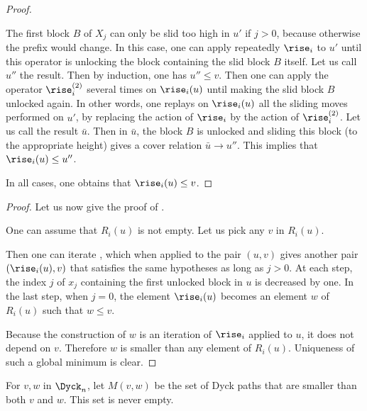 \begin{proof}
\begin{enumerate}
  The first block $B$ of $X_j$ can only be slid too high in $u'$ if
  $j > 0$, because otherwise the prefix would change. In this case,
  one can apply repeatedly $\rise_i$ to $u'$ until this operator is
  unlocking the block containing the slid block $B$ itself. Let us
  call $u''$ the result. Then by induction, one has $u'' \leq v$. Then
  one can apply the operator $\rise^{(2)}_i$ several times on
  $\rise_i(u)$ until making the slid block $B$ unlocked again. In
  other words, one replays on $\rise_i(u)$ all the sliding moves
  performed on $u'$, by replacing the action of $\rise_i$ by the
  action of $\rise^{(2)}_i$. Let us call the result $\bar{u}$. Then in $\bar{u}$,
  the block $B$ is unlocked and sliding this block (to the appropriate
  height) gives a cover relation $\bar{u} \to u''$. This implies that
  $\rise_i(u) \leq u''$.
\end{enumerate}

  In all cases, one obtains that $\rise_i(u) \leq v$.
\end{proof}

\begin{proof}
Let us now give the proof of . 

One can assume that $R_i(u)$ is not empty. Let us pick any $v$ in $R_i(u)$.

Then one can iterate , which when applied to the
pair $(u,v)$ gives another pair $(\rise_i(u),v)$ that satisfies the
same hypotheses as long as $j > 0$. At each step, the index $j$ of
$x_j$ containing the first unlocked block in $u$ is decreased by
one. In the last step, when $j=0$, the element $\rise_i(u)$ becomes an
element $w$ of $R_i(u)$ such that $w \leq v$.

Because the construction of $w$ is an iteration of $\rise_i$ applied
to $u$, it does not depend on $v$. Therefore $w$ is smaller than any
element of $R_i(u)$. Uniqueness of such a global minimum is clear.
\end{proof}

%

For $v,w$ in $\Dyck_n$, let $M(v,w)$ be the set of Dyck paths that are
smaller than both $v$ and $w$. This set is never empty.

